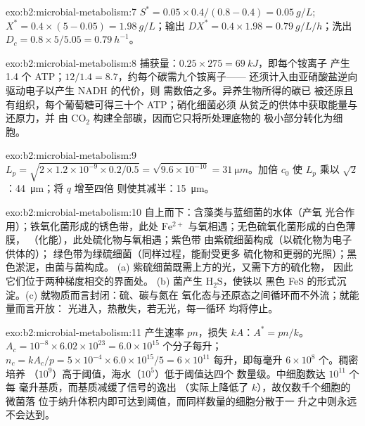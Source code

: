\begin{solution}{exo:b2:microbial-metabolism:7}
$S^* = 0.05\times 0.4/(0.8 - 0.4) = \qty{0.05}{g/L}$; $X^* =
0.4\times(5 - 0.05) = \qty{1.98}{g/L}$；输出 $DX^* = 0.4\times
1.98 = \qty{0.79}{g/L/h}$；洗出 $D_c = 0.8\times 5/5.05 =
\qty{0.79}{h^{-1}}$。
\end{solution}

\begin{solution}{exo:b2:microbial-metabolism:8}
捕获量：$0.25\times 275 = \qty{69}{kJ}$，即每个铵离子
产生 1.4 个 ATP；$12/1.4 = 8.7$，约每个碳需九个铵离子——
还须计入由亚硝酸盐逆向驱动电子以产生 NADH 的代价，则
需数倍之多。异养生物所得的碳已
被还原且有组织，每个葡萄糖可得三十个 ATP；硝化细菌必须
从贫乏的供体中获取能量与还原力，并
由 $\mathrm{CO_2}$ 构建全部碳，因而它只将所处理底物的
极小部分转化为细胞。
\end{solution}

\begin{solution}{exo:b2:microbial-metabolism:9}
$L_p = \sqrt{2\times 1.2\times 10^{-9}\times 0.2/0.5} =
\sqrt{9.6\times 10^{-10}} = \qty{31}{\micro m}$。加倍 $c_0$
使 $L_p$ 乘以 $\sqrt 2$：\qty{44}{\micro m}；将 $q$ 增至四倍
则使其减半：\qty{15}{\micro m}。
\end{solution}

\begin{solution}{exo:b2:microbial-metabolism:10}
自上而下：含藻类与蓝细菌的水体（产氧
光合作用）；铁氧化菌形成的锈色带，此处 $\mathrm{Fe^{2+}}$
与氧相遇；无色硫氧化菌形成的白色薄膜，
（化能），此处硫化物与氧相遇；紫色带
由紫硫细菌构成（以硫化物为电子供体的）；
绿色带为绿硫细菌（同样过程，能耐受更多
硫化物和更弱的光照）；黑色淤泥，由菌与菌构成。
(a) 紫硫细菌既需上方的光，又需下方的硫化物，
因此它们位于两种梯度相交的界面处。
(b) 菌产生 $\mathrm{H_2S}$，使铁以
黑色 FeS 的形式沉淀。(c) 就物质而言封闭：硫、碳与氮在
氧化态与还原态之间循环而不外流；就能量而言开放：
光进入，热散失，若无光，每一循环
均将停止。
\end{solution}

\begin{solution}{exo:b2:microbial-metabolism:11}
产生速率 $pn$，损失 $kA$：$A^* = pn/k$。$A_c = 10^{-8}\times
6.02\times 10^{23} = 6.0\times 10^{15}$ 个分子每升；$n_c =
kA_c/p = 5\times 10^{-4}\times 6.0\times 10^{15}/5 = 6\times 10^{11}$
每升，即每毫升 $6\times 10^{8}$ 个。稠密培养
（$10^{9}$）高于阈值，海水（$10^{5}$）低于阈值达四个
数量级。中细胞数达 $10^{11}$ 个每
毫升基质，而基质减缓了信号的逸出
（实际上降低了 $k$），故仅数千个细胞的微菌落
位于纳升体积内即可达到阈值，而同样数量的细胞分散于一
升之中则永远不会达到。
\end{solution}

